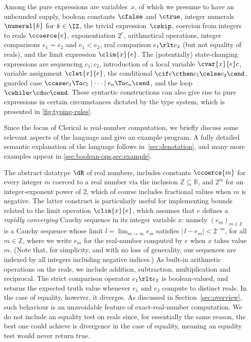 Among the pure expressions are variables~$x$, of which we presume to have an unbounded supply, boolean constants $\cfalse$ and $\ctrue$, integer numerals~$\numeral{k}$ for $k \in \IZ$, the trivial expression~$\cskip$, coercion from integers to reals $\ccoerce{e}$, exponentiation $2^e$, arithmetical operations, integer comparisons $e_1 = e_2$ and $e_1 < e_2$, real comparison $e_1 \rlt e_2$ (but not equality of reals), and the limit expression $\clim{x}{e}$.
%
The (potentially) state-changing expressions are sequencing $c_1; c_2$, introduction of a local variable $\cvar{x}{e} c$, variable assignment $\clet{x}{e}$, the conditional $\cif e \cthen c_1 \celse c_2 \cend$, guarded case $\ccase e_1 \To c_1 \mid \cdots \mid e_n \To c_n \cend$, and the loop $\cwhile e \cdo c \cend$. These syntactic constructions can also give rise to pure expressions  in certain circumstances dictated by the type system, which is presented in  \cref{fig:typing-rules}. 

Since the focus of Clerical is real-number computation, we briefly discuss some relevant aspects of the language and give an example program. A fully  detailed semantic explanation of the language follows in~\cref{sec:denotation}, and many more  examples appear in \cref{sec:boolean-ops,sec:example}.

The abstract datatype $\dR$ of real numbers, includes constants $\ccoerce{m}$ for every integer $m$  coerced to a real number via
the inclusion $\mathbb{Z} \subseteq \mathbb{R}$, and $2^m$ for an integer-exponent power of $2$, which of course includes fractional values when $m$ is negative. The latter construct is particularly useful for implementing bounds related to the limit operation $\clim{x}{e}$,
which assumes that $e$ defines a \emph{rapidly converging} Cauchy sequence in its integer variable $x$: namely
$(e_m)_{m \in \mathbb{Z}}$ is a Cauchy sequence whose limit $l = \lim_{m \to \infty} e_m$ satisfies
$|\,l-e_m| < 2^{-m}$, for all $m\in \mathbb{Z}$,
where we write $e_m$ for the real-number
computed by $e$ when $x$ takes value $m$. (Note that, for simplicity, and with no loss of generality, our sequences are indexed by all integers including negative indices.)
As built-in arithmetic operations on the reals, we include addition, subtraction, multiplication and reciprocal. The strict comparison operator
$e_1 \rlt e_2$ is boolean-valued, and returns the expected truth value whenever $e_1$ and $e_2$ compute to distinct reals. 
In the case of equality, however, it diverges. As discussed in Section~\ref{sec:overview}, such behaviour is an unavoidable feature of
exact-real-number computation. We do not include an equality test on reals since, for essentially the same reason, the best one could achieve is divergence in the case of equality, meaning an equality test would never return true. 


